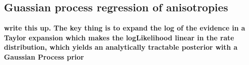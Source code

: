 \documentclass{article}
\begin{document}
\subsection*{Guassian process regression of anisotropies}

\textbf{write this up. The key thing is to expand the log of the evidence in a Taylor expansion which makes the logLikelihood linear in the rate distribution, which yields an analytically tractable posterior with a Gaussian Process prior}

\end{document}
